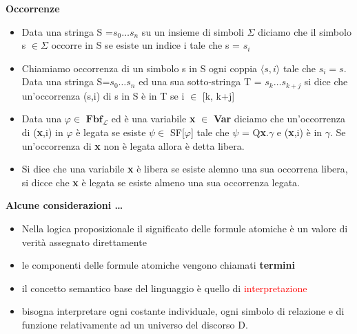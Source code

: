 \documentclass[a4paper, 12pt]{book}
\begin{document}
\textbf{Occorrenze}
\begin{itemize}
  \item Data una stringa S =$s_0 \dots s_n$ su un insieme di simboli $\Sigma$ diciamo che il simbolo s $\in \Sigma$ occorre in S se esiste un indice i tale che s = $s_i$
  \item Chiamiamo occorrenza di un simbolo s in S ogni coppia $\langle s,i \rangle$ tale che $s_i = s$. Data una stringa S=$s_0 \dots s_n$ ed una sua sotto-stringa T = $s_k \dots s_{k+j}$ si dice che un'occorrenza (s,i) di s in S è in T se i $\in$ [k, k+j]
  \item Data una $\varphi \in$ $\textbf{Fbf}_{\mathcal{L}}$ ed è una variabile \textbf{x} $\in$ \textbf{Var} diciamo che un'occorrenza di (\textbf{x},i) in $\varphi$ è legata se esiste $\psi \in$ SF[$\varphi$] tale che $\psi$ = Q\textbf{x}.$\gamma$ e (\textbf{x},i) è in $\gamma$. Se un'occorrenza di \textbf{x} non è legata allora è detta libera.
  \item Si dice che una variabile \textbf{x} è libera se esiste alemno una sua occorrena libera, si dicce che \textbf{x} è legata se esiste almeno una sua occorrenza legata.
\end{itemize}



\textbf{Alcune considerazioni \dots}

\begin{itemize}
  \item Nella logica proposizionale il significato delle formule atomiche è un valore di verità assegnato direttamente
  \item le componenti delle formule atomiche vengono chiamati \textbf{termini}
  \item il concetto semantico base del linguaggio è quello di \textcolor{red}{interpretazione}
  \item bisogna interpretare ogni costante individuale, ogni simbolo di relazione e di funzione relativamente ad un universo del discorso D.
\end{itemize}
\end{document}

